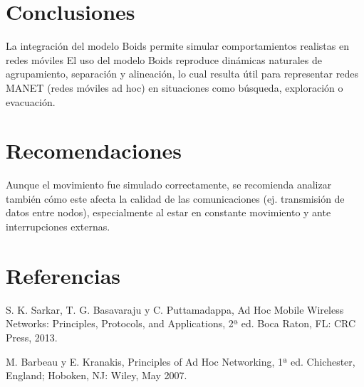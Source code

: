 \documentclass{article}
\begin{document}

\section{Conclusiones}\label{sec:concl}

La integración del modelo Boids permite simular comportamientos realistas en redes móviles
El uso del modelo Boids reproduce dinámicas naturales de agrupamiento, separación y alineación, lo cual resulta útil para representar redes MANET (redes móviles ad hoc) en situaciones como búsqueda, exploración o evacuación.

\section{Recomendaciones}\label{secrecomen}

Aunque el movimiento fue simulado correctamente, se recomienda analizar también cómo este afecta la calidad de las comunicaciones (ej. transmisión de datos entre nodos), especialmente al estar en constante movimiento y ante interrupciones externas.

\section{Referencias}
\renewcommand{\refname}{}
\begin{thebibliography}{9}

 \label{ref:AdHoc} S. K. Sarkar, T. G. Basavaraju y C. Puttamadappa, 
Ad Hoc Mobile Wireless Networks: Principles, Protocols, and Applications, 2ª ed. 
Boca Raton, FL: CRC Press, 2013.

 \label{ref:PrinciplesAdHoc} M. Barbeau y E. Kranakis, Principles of Ad Hoc 
Networking, 1ª ed. Chichester, England; Hoboken, NJ: Wiley, May 2007.

\end{thebibliography}
\end{document}
